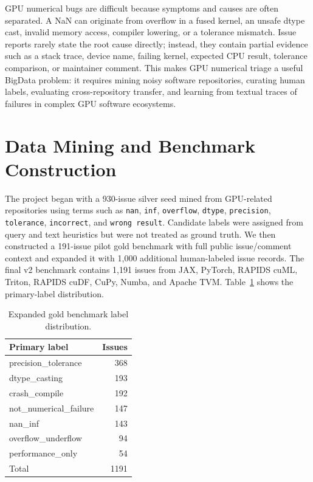\documentclass[conference]{IEEEtran}
\begin{document}
GPU numerical bugs are difficult because symptoms and causes are often
separated. A NaN can originate from overflow in a fused kernel, an unsafe dtype
cast, invalid memory access, compiler lowering, or a tolerance mismatch. Issue
reports rarely state the root cause directly; instead, they contain partial
evidence such as a stack trace, device name, failing kernel, expected CPU
result, tolerance comparison, or maintainer comment. This makes GPU numerical
triage a useful BigData problem: it requires mining noisy software repositories,
curating human labels, evaluating cross-repository transfer, and learning from
textual traces of failures in complex GPU software ecosystems.

\section{Data Mining and Benchmark Construction}

The project began with a 930-issue silver seed mined from GPU-related
repositories using terms such as \texttt{nan}, \texttt{inf},
\texttt{overflow}, \texttt{dtype}, \texttt{precision}, \texttt{tolerance},
\texttt{incorrect}, and \texttt{wrong result}. Candidate labels were assigned
from query and text heuristics but were not treated as ground truth. We then
constructed a 191-issue pilot gold benchmark with full public issue/comment
context and expanded it with 1,000 additional human-labeled issue records. The
final v2 benchmark contains 1,191 issues from JAX, PyTorch, RAPIDS cuML,
Triton, RAPIDS cuDF, CuPy, Numba, and Apache TVM. Table~\ref{tab:labels}
shows the primary-label distribution.

\begin{table}[t]
\centering
\caption{Expanded gold benchmark label distribution.}
\label{tab:labels}
\begin{tabular}{lr}
\toprule
Primary label & Issues \\
\midrule
precision\_tolerance & 368 \\
dtype\_casting & 193 \\
crash\_compile & 192 \\
not\_numerical\_failure & 147 \\
nan\_inf & 143 \\
overflow\_underflow & 94 \\
performance\_only & 54 \\
\midrule
Total & 1191 \\
\bottomrule
\end{tabular}
\end{table}
\end{document}
